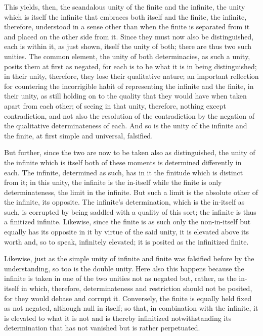 This yields, then, the scandalous unity
of the finite and the infinite,
the unity which is itself the infinite
that embraces both itself and the finite,
the infinite, therefore, understood in a sense
other than when the finite is separated from it
and placed on the other side from it.
Since they must now also be distinguished,
each is within it, as just shown,
itself the unity of both;
there are thus two such unities.
The common element, the unity of both determinacies,
as such a unity, posits them at first as negated,
for each is to be what it is in being distinguished;
in their unity, therefore, they lose their qualitative nature;
an important reflection for countering the incorrigible habit
of representing the infinite and the finite, in their unity,
as still holding on to the quality that
they would have when taken apart from each other;
of seeing in that unity, therefore, nothing except contradiction,
and not also the resolution of the contradiction by
the negation of the qualitative determinateness of each.
And so is the unity of the infinite and the finite,
at first simple and universal, falsified.

But further, since the two are now to be taken
also as distinguished, the unity of the infinite
which is itself both of these moments
is determined differently in each.
The infinite, determined as such, has in it
the finitude which is distinct from it;
in this unity, the infinite is the in-itself
while the finite is only determinateness,
the limit in the infinite.
But such a limit is the absolute
other of the infinite, its opposite.
The infinite's determination, which is the in-itself as such,
is corrupted by being saddled with a quality of this sort;
the infinite is thus a finitized infinite.
Likewise, since the finite is as such only the non-in-itself
but equally has its opposite in it by virtue
of the said unity,
it is elevated above its worth
and, so to speak, infinitely elevated;
it is posited as the infinitized finite.

Likewise, just as the simple unity of infinite and finite was
falsified before by the understanding, so too is the double unity.
Here also this happens because the infinite is taken
in one of the two unities not as negated but,
rather, as the in-itself in which, therefore,
determinateness and restriction should not be posited,
for they would debase and corrupt it.
Conversely, the finite is equally held fixed
as not negated, although null in itself;
so that, in combination with the infinite,
it is elevated to what it is not
and is thereby infinitized notwithstanding its determination
that has not vanished but is rather perpetuated.

